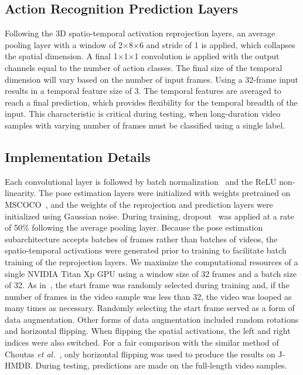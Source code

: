\documentclass[10pt, conference, compsocconf]{IEEEtran}
\begin{document}
\subsection{Action Recognition Prediction Layers}

Following the 3D spatio-temporal activation reprojection layers, an average pooling layer with a window of 2$\times$8$\times$6 and stride of 1 is applied, which collapses the spatial dimension. A final 1$\times$1$\times$1 convolution is applied with the output channels equal to the number of action classes. The final size of the temporal dimension will vary based on the number of input frames. Using a 32-frame input results in a temporal feature size of 3. The temporal features are averaged to reach a final prediction, which provides flexibility for the temporal breadth of the input. This characteristic is critical during testing, when long-duration video samples with varying number of frames must be classified using a single label. 

\subsection{Implementation Details}
Each convolutional layer is followed by batch normalization~\cite{ioffe2015batch} and the ReLU non-linearity. The pose estimation layers were initialized with weights pretrained on MSCOCO~\cite{lin2014microsoft}, and the weights of the reprojection and prediction layers were initialized using Gaussian noise. During training, dropout~\cite{srivastava2014dropout} was applied at a rate of 50\% following the average pooling layer. Because the pose estimation subarchitecture accepts batches of frames rather than batches of videos, the spatio-temporal activations were generated prior to training to facilitate batch training of the reprojection layers. We maximize the computational resources of a single NVIDIA Titan Xp GPU using a window size of 32 frames and a batch size of 32. As in~\cite{carreira2017quo}, the start frame was randomly selected during training and, if the number of frames in the video sample was less than 32, the video was looped as many times as necessary. Randomly selecting the start frame served as a form of data augmentation. Other forms of data augmentation included random rotations and horizontal flipping. When flipping the spatial activations, the left and right indices were also switched. For a fair comparison with the similar method of Choutas \textit{et al.}~\cite{choutas2018potion}, only horizontal flipping was used to produce the results on J-HMDB. During testing, predictions are made on the full-length video samples. 
\end{document}
